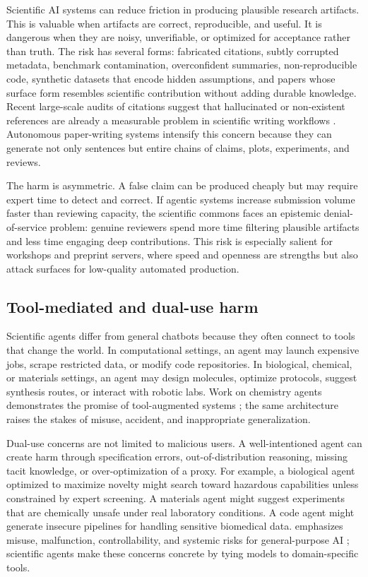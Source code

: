 \documentclass{article}
\begin{document}
Scientific AI systems can reduce friction in producing plausible research artifacts. This is valuable when artifacts are correct, reproducible, and useful. It is dangerous when they are noisy, unverifiable, or optimized for acceptance rather than truth. The risk has several forms: fabricated citations, subtly corrupted metadata, benchmark contamination, overconfident summaries, non-reproducible code, synthetic datasets that encode hidden assumptions, and papers whose surface form resembles scientific contribution without adding durable knowledge. Recent large-scale audits of citations suggest that hallucinated or non-existent references are already a measurable problem in scientific writing workflows \citep{zhao2026hallucinations}. Autonomous paper-writing systems intensify this concern because they can generate not only sentences but entire chains of claims, plots, experiments, and reviews.

The harm is asymmetric. A false claim can be produced cheaply but may require expert time to detect and correct. If agentic systems increase submission volume faster than reviewing capacity, the scientific commons faces an epistemic denial-of-service problem: genuine reviewers spend more time filtering plausible artifacts and less time engaging deep contributions. This risk is especially salient for workshops and preprint servers, where speed and openness are strengths but also attack surfaces for low-quality automated production.

\subsection{Tool-mediated and dual-use harm}

Scientific agents differ from general chatbots because they often connect to tools that change the world. In computational settings, an agent may launch expensive jobs, scrape restricted data, or modify code repositories. In biological, chemical, or materials settings, an agent may design molecules, optimize protocols, suggest synthesis routes, or interact with robotic labs. Work on chemistry agents demonstrates the promise of tool-augmented systems \citep{bran2023chemcrow,boiko2023emergent}; the same architecture raises the stakes of misuse, accident, and inappropriate generalization.

Dual-use concerns are not limited to malicious users. A well-intentioned agent can create harm through specification errors, out-of-distribution reasoning, missing tacit knowledge, or over-optimization of a proxy. For example, a biological agent optimized to maximize novelty might search toward hazardous capabilities unless constrained by expert screening. A materials agent might suggest experiments that are chemically unsafe under real laboratory conditions. A code agent might generate insecure pipelines for handling sensitive biomedical data. \citep{bengio2024international} emphasizes misuse, malfunction, controllability, and systemic risks for general-purpose AI ; scientific agents make these concerns concrete by tying models to domain-specific tools.
\end{document}
